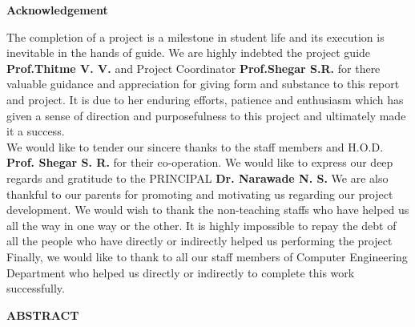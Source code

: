 \documentclass[12,Times new Roman,a4paper]{report}
\begin{document}
\newpage
\begin{center}
\Large{\textbf{Acknowledgement}}\\[1cm]
\end{center}
\large{The completion of a project is a milestone in student life and its 
execution is inevitable in the hands of guide. We are highly indebted the project 
guide \textbf{Prof.Thitme V. V.} and Project Coordinator \textbf{Prof.Shegar S.R.} for there valuable guidance and appreciation for giving 
form and substance to this report and project. It is due to her enduring efforts, patience and 
enthusiasm which has given a sense of direction and purposefulness to this project 
and ultimately made it a success.}\\[0.5cm]
\large {We would like to tender our sincere thanks to the staff members and 
H.O.D.  \textbf{Prof. Shegar S. R.} for their co-operation. We would like to express our 
deep regards and gratitude to the PRINCIPAL \textbf{Dr. Narawade N. S.}  We are also thankful to our parents 
for promoting and motivating us regarding our project development. We would 
wish to thank the non-teaching staffs who have helped us all the way in one way 
or the other. It is highly impossible to repay the debt of all the people who have 
directly or indirectly helped us performing the project}\\[0.5cm]
\large{Finally, we would like to thank to all our staff members of Computer Engineering Department who helped us directly or indirectly to complete this work successfully.}
\newpage
\begin{center}
\Large{\textbf{ABSTRACT}}\\[1cm]
\end{center}
\end{document}
